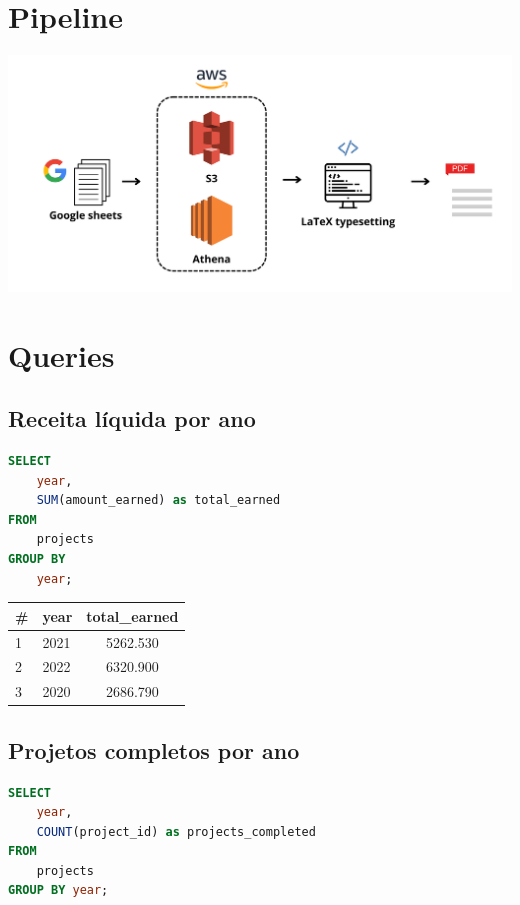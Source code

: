 \documentclass{queriessql}
\begin{document}
\section{Pipeline}
\begin{center}
    \includegraphics[width=0.9\linewidth]{Figuras/Pipeline-descricao.png}
\end{center}

\clearpage %

\section{Queries}

\subsection{Receita líquida por ano}

\begin{lstlisting}[language=SQL]
SELECT 
    year,
    SUM(amount_earned) as total_earned
FROM 
    projects
GROUP BY 
    year;
\end{lstlisting}


\begin{tabular}{llc}
   \# & \textbf{year} & \textbf{total\_earned} 
      \\ \hline
    1 & 2021 & 5262.530
      \\
    2 & 2022 & 6320.900
      \\
    3 & 2020 & 2686.790
\end{tabular}

\subsection{Projetos completos por ano}

\begin{lstlisting}[language=SQL]
SELECT
    year,
    COUNT(project_id) as projects_completed
FROM    
    projects
GROUP BY year;
\end{lstlisting}
\end{document}
